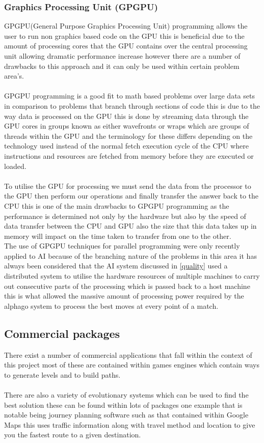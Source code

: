 \subsubsection{Graphics Processing Unit (GPGPU)}
GPGPU(General Purpose Graphics Processing Unit) programming allows the user to run non graphics based code on the GPU this is beneficial due to the amount of processing cores that the GPU contains over the central processing unit allowing dramatic performance increase however there are a number of drawbacks to this approach and it can only be used within certain problem area's.\\\\ GPGPU programming is a good fit to math based problems over large data sets in comparison to problems that branch through sections of code this is due to the way data is processed on the GPU this is done by streaming data through the GPU cores in groups known as either wavefronts or wraps which are groups of threads within the GPU and the terminology for these differs depending on the technology used instead of the normal fetch execution cycle of the CPU where instructions and resources are fetched from memory before they are executed or loaded.\\\\ To utilise the GPU for processing we must send the data from the processor to the GPU then perform our operations and finally transfer the answer back to the CPU this is one of the main drawbacks to GPGPU programming as the performance is determined not only by the hardware but also by the speed of data transfer between the CPU and GPU also the size that this data takes up in memory will impact on the time taken to transfer from one to the other.\\    

The use of GPGPU techniques for parallel programming were only recently applied to AI because of the branching nature of the problems in this area it has always been considered that  the AI system discussed in \ref{quality} used a distributed system to utilise the hardware resources of multiple machines to carry out consecutive parts of the processing which is passed back to a host machine this is what allowed the massive amount of processing power required by the alphago system to process the best moves at every point of a match. 

\subsection{Commercial packages}
There exist a number of commercial applications that fall within the context of this project most of these are contained within  games engines which contain ways to generate levels and to build paths.\\\\ There are also a variety of evolutionary systems which can be used to find the best solution these can be found within lots of packages one example that is notable being journey planning software such as that contained within Google Maps this uses traffic information along with travel method and location to give you the fastest route to a given destination. 

